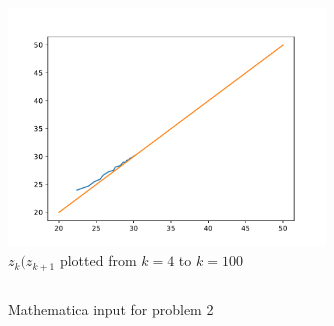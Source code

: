 \documentclass[12pt, a4paper]{article}
\begin{document}
  \begin{figure}
    \centering
    \includegraphics[width=0.75\textwidth]{zk.pdf}
    \caption{$z_k(z_{k+1}$ plotted from $k=4$ to $k=100$}
  \end{figure}


  \begin{figure}
    \captionsetup{type=listing}
    \inputminted{python}{problem2.py}
    \caption{Mathematica input for problem 2}
  \end{figure}
  
\end{document}
